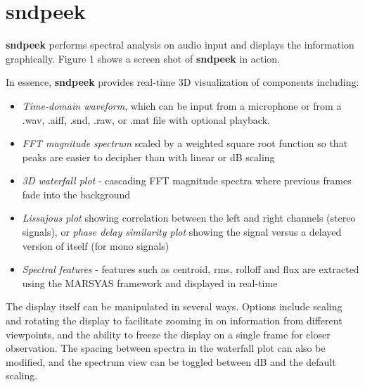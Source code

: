 \documentclass{article}
\begin{document}



\section{sndpeek}

{\bf sndpeek} performs spectral analysis on audio input and displays the information graphically. Figure 1 shows a screen shot of {\bf sndpeek} in action. 


In essence, {\bf sndpeek} provides real-time 3D visualization of components including:
\begin{itemize}
\setlength{\itemsep}{-2pt}
\item \textit{Time-domain waveform}, which can be input from a microphone 
or from a .wav, .aiff, .snd, .raw, or .mat file with optional playback. 
\item \textit{FFT magnitude spectrum} scaled by a weighted square root function so that peaks are easier to decipher than with linear or dB scaling
\item \textit{3D waterfall plot} - cascading FFT magnitude spectra where previous frames fade into the background
\item \textit{Lissajous plot} showing correlation between the left and right channels (stereo signals), or {\it phase delay similarity plot} showing the signal versus a delayed version of itself (for mono signals)
\item \textit{Spectral features} - features such as centroid, rms, rolloff and flux are extracted using the MARSYAS framework \cite{Tzanetakis:00} and displayed in real-time
\end{itemize}

The display itself can be manipulated in several ways. Options include scaling and rotating the display to facilitate zooming in on information from different viewpoints, and the ability to freeze the display on a single frame for closer observation. The spacing between spectra in the waterfall plot can also be modified, and the spectrum view can be toggled between dB and the default scaling. 
\end{document}
